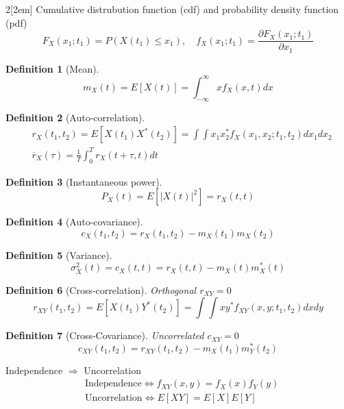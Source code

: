 \documentclass[leqno]{article}
\newtheorem*{definition}{Definition}
\begin{document}
\begin{multicols}{2}[\columnsep2em]
Cumulative distrubution function (cdf) and probability density function (pdf)
\[
F_X(x_1;t_1) = P(X(t_1)\le x_1), \quad f_X(x_1;t_1) = \frac{\partial F_X(x_1; t_1)}{\partial x_1}
\] 

\begin{definition}[Mean]
\[
m_X(t) = E[X(t)] = \int_{-\infty}^\infty xf_X(x, t)dx
\] 
\end{definition}

\begin{definition}[Auto-correlation]
\begin{align*}
  & r_X(t_1, t_2) = E[X(t_1)X^*(t_2)] = \int \int x_1x_2^* f_X(x_1, x_2; t_1, t_2)dx_1dx_2 \\
  & \overline{r}_{X}(\tau ) = \frac{1}{T} \int_{0}^T r_X(t+\tau ,t) dt
\end{align*}
\end{definition}


\begin{definition}[Instantaneous power]
\[
P_X(t) = E[|X(t)|^2] = r_X(t,t)
\] 
\end{definition}

\begin{definition}[Auto-covariance]
\[
c_X(t_1, t_2) = r_X(t_1, t_2) - m_X(t_1)m_X(t_2)
\] 
\end{definition}

\begin{definition}[Variance]
\[
\sigma^2_{X}(t) = c_X(t,t) = r_X(t, t) - m_X(t)m_X^*(t)
\] 
\end{definition}

\begin{definition}[Cross-correlation] Orthogonal $ r_{XY} = 0$
\[
r_{XY}(t_1, t_2) = E[X(t_1)Y^*(t_2)]= \int\int xy^*f_{XY}(x, y; t_1, t_2)dxdy
\] 
\end{definition}

\begin{definition}[Cross-Covariance] Uncorrelated $ c_{XY} = 0$
\[
c_{XY}(t_1,t_2) = r_{XY}(t_1,t_2) - m_X(t_1)m_Y^*(t_2)
\] 
\end{definition}

Independence $\Rightarrow$ Uncorrelation
\begin{align*}
  & \text{Independence} \iff f_{XY}(x, y) = f_X(x)f_Y(y) \\
  & \text{Uncorrelation} \iff E[XY] = E[X]E[Y]
\end{align*}


\end{multicols}
\end{document}
